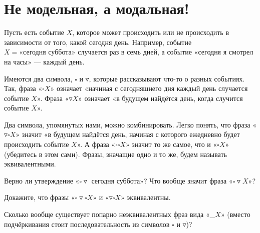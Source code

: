 \section{Не модельная, а модальная!}
\noindent Пусть есть событие $X$, которое может происходить или не происходить в зависимости от того, какой сегодня день. Например, событие $X = \text{«сегодня суббота»}$ случается раз в семь дней, а событие «сегодня я смотрел на часы» — каждый день. 

\def\sq{\square}
\def\td{\triangledown}
\ms Имеются два символа, $\square$ и $\triangledown$, которые рассказывают что-то о разных событиях. Так, фраза «$\sq X$» означает «начиная с сегодняшнего дня каждый день случается событие $X$». Фраза «$\td X$» означает «в будущем найдётся день, когда случится событие $X$».

\ms Два символа, упомянутых нами, можно комбинировать. Легко понять, что фраза «$\td\sq X$» значит «в будущем найдётся день, начиная с которого ежедневно будет происходить событие $X$». А фраза «$\sq\sq X$» значит то же самое, что и «$\sq X$» (убедитесь в этом сами). Фразы, значащие одно и то же, будем называть эквивалентными.

\begin{enumerate}
\itA Верно ли утверждение «$\sq\td \text{ сегодня суббота}$»? Что вообще значит фраза «$\sq\td X$»?

\itB Докажите, что фразы «$\sq\td\sq X$» и «$\td\sq X$» эквивалентны.

\itC Сколько вообще существует попарно неэквивалентных фраз вида «\_$X$» (вместо подчёркивания стоит последовательность из символов $\sq$ и $\td$)?
\end{enumerate}